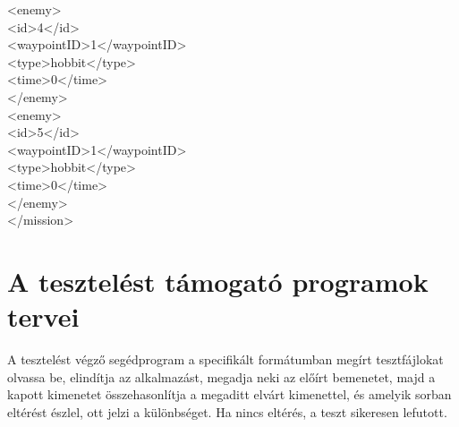 \phantom{pina}<enemy>\\
\phantom{pina}\phantom{pina}<id>4</id>\\
\phantom{pina}\phantom{pina}<waypointID>1</waypointID>\\
\phantom{pina}\phantom{pina}<type>hobbit</type>\\
\phantom{pina}\phantom{pina}<time>0</time>\\
\phantom{pina}</enemy>\\
\phantom{pina}<enemy>\\
\phantom{pina}\phantom{pina}<id>5</id>\\
\phantom{pina}\phantom{pina}<waypointID>1</waypointID>\\
\phantom{pina}\phantom{pina}<type>hobbit</type>\\
\phantom{pina}\phantom{pina}<time>0</time>\\
\phantom{pina}</enemy>\\
</mission>\\


\section{A tesztelést támogató programok tervei}

A tesztelést végző segédprogram a specifikált formátumban megírt tesztfájlokat olvassa be, elindítja az alkalmazást, megadja neki az előírt bemenetet, majd a kapott kimenetet összehasonlítja a megaditt elvárt kimenettel, és amelyik sorban eltérést észlel, ott jelzi a különbséget. Ha nincs eltérés, a teszt sikeresen lefutott.